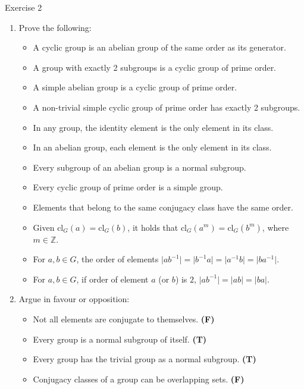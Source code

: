\documentclass{beamer}
\newcounter{savedenum}
\newcommand*{\saveenum}{\setcounter{savedenum}{\theenumi}}
\begin{document}
\begin{frame}{Exercise 2}
    \begin{enumerate}
        \item Prove the following:
        \begin{itemize}
            \item A cyclic group is an abelian group of the same order as its generator.
            \item A group with exactly 2 subgroups is a cyclic group of prime order.
            \item A simple abelian group is a cyclic group of prime order.
            \item A non-trivial simple cyclic group of prime order has exactly 2 subgroups.
            \item In any group, the identity element is the only element in its class.
            \item In an abelian group, each element is the only element in its class.
            \item Every subgroup of an abelian group is a normal subgroup.
            \item Every cyclic group of prime order is a simple group.
            \item Elements that belong to the same conjugacy class have the same order.
            \item Given $\text{cl}_G(a)=\text{cl}_G(b)$, it holds that $\text{cl}_G(a^m)=\text{cl}_G(b^m)$, where $m\in\mathbb{Z}$.
            \item For $a,b\in G$, the order of elements $\lvert ab^{-1}\rvert=\lvert b^{-1}a\rvert=\lvert a^{-1}b\rvert=\lvert ba^{-1}\rvert$.
            \item For $a,b\in G$, if order of element $a$ (or $b$) is $2$, $\lvert ab^{-1}\rvert=\lvert ab\rvert=\lvert ba\rvert$.
        \end{itemize}
        \item Argue in favour or opposition:
        \begin{itemize}
            \item Not all elements are conjugate to themselves. \textbf{(F)}
            \item Every group is a normal subgroup of itself. \textbf{(T)}
            \item Every group has the trivial group as a normal subgroup. \textbf{(T)}
            \item Conjugacy classes of a group can be overlapping sets. \textbf{(F)}
        \end{itemize}
        \saveenum
    \end{enumerate}
\end{frame}
\end{document}
